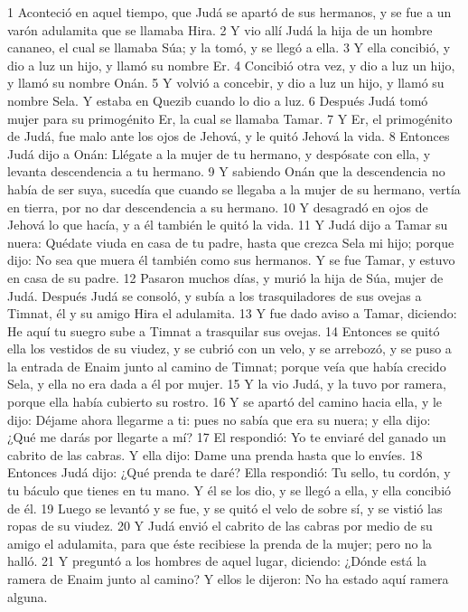 1 Aconteció en aquel tiempo, que Judá se apartó de sus hermanos, y se fue a un varón adulamita que se llamaba Hira.
2 Y vio allí Judá la hija de un hombre cananeo, el cual se llamaba Súa; y la tomó, y se llegó a ella.
3 Y ella concibió, y dio a luz un hijo, y llamó su nombre Er.
4 Concibió otra vez, y dio a luz un hijo, y llamó su nombre Onán.
5 Y volvió a concebir, y dio a luz un hijo, y llamó su nombre Sela. Y estaba en Quezib cuando lo dio a luz.
6 Después Judá tomó mujer para su primogénito Er, la cual se llamaba Tamar.
7 Y Er, el primogénito de Judá, fue malo ante los ojos de Jehová, y le quitó Jehová la vida.
8 Entonces Judá dijo a Onán: Llégate a la mujer de tu hermano, y despósate con ella, y levanta descendencia a tu hermano.
9 Y sabiendo Onán que la descendencia no había de ser suya, sucedía que cuando se llegaba a la mujer de su hermano, vertía en tierra, por no dar descendencia a su hermano.
10 Y desagradó en ojos de Jehová lo que hacía, y a él también le quitó la vida.
11 Y Judá dijo a Tamar su nuera: Quédate viuda en casa de tu padre, hasta que crezca Sela mi hijo; porque dijo: No sea que muera él también como sus hermanos. Y se fue Tamar, y estuvo en casa de su padre.
12 Pasaron muchos días, y murió la hija de Súa, mujer de Judá. Después Judá se consoló, y subía a los trasquiladores de sus ovejas a Timnat, él y su amigo Hira el adulamita.
13 Y fue dado aviso a Tamar, diciendo: He aquí tu suegro sube a Timnat a trasquilar sus ovejas.
14 Entonces se quitó ella los vestidos de su viudez, y se cubrió con un velo, y se arrebozó, y se puso a la entrada de Enaim junto al camino de Timnat; porque veía que había crecido Sela, y ella no era dada a él por mujer.
15 Y la vio Judá, y la tuvo por ramera, porque ella había cubierto su rostro.
16 Y se apartó del camino hacia ella, y le dijo: Déjame ahora llegarme a ti: pues no sabía que era su nuera; y ella dijo: ¿Qué me darás por llegarte a mí?
17 El respondió: Yo te enviaré del ganado un cabrito de las cabras. Y ella dijo: Dame una prenda hasta que lo envíes.
18 Entonces Judá dijo: ¿Qué prenda te daré? Ella respondió: Tu sello, tu cordón, y tu báculo que tienes en tu mano. Y él se los dio, y se llegó a ella, y ella concibió de él.
19 Luego se levantó y se fue, y se quitó el velo de sobre sí, y se vistió las ropas de su viudez.
20 Y Judá envió el cabrito de las cabras por medio de su amigo el adulamita, para que éste recibiese la prenda de la mujer; pero no la halló.
21 Y preguntó a los hombres de aquel lugar, diciendo: ¿Dónde está la ramera de Enaim junto al camino? Y ellos le dijeron: No ha estado aquí ramera alguna.
